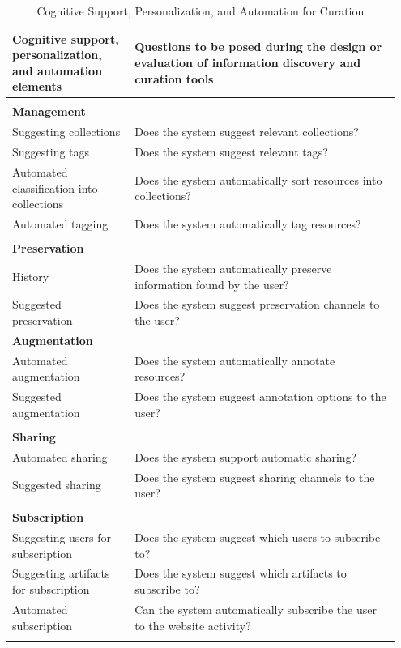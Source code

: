 \documentclass{sigchi}
\begin{document}
{{{\begin{table}[ht!]
\caption{Cognitive Support, Personalization, and Automation for Curation}
\label{table:curation_support}
\begin{tabular}{| p{0.30\linewidth}|p{0.65\linewidth}|}
\hline
Cognitive support, personalization, and automation elements & Questions to be posed during the design or evaluation of information discovery and curation tools \\
\hline
& \\
\textbf{Management}		& \\
Suggesting collections  & Does the system suggest relevant collections? \\
Suggesting tags         & Does the system suggest relevant tags? \\
Automated classification into collections  	& Does the system automatically sort resources into collections? \\
Automated tagging       & Does the system automatically tag resources? \\
& \\
\textbf{Preservation}   & \\
History       			& Does the system automatically preserve information found by the user? \\
Suggested preservation  & Does the system suggest preservation channels to the user? \\
\textbf{Augmentation} 	& \\
Automated augmentation  & Does the system automatically annotate resources? \\
Suggested augmentation  & Does the system suggest annotation options to the user? \\    
& \\
\textbf{Sharing}        & \\
Automated sharing		& Does the system support automatic sharing? \\
Suggested sharing		& Does the system suggest sharing channels to the user? \\
& \\
\textbf{Subscription}   & \\
Suggesting users for subscription & Does the system suggest which users to subscribe to? \\
Suggesting artifacts for subscription   & Does the system suggest which artifacts to subscribe to? \\ 
Automated subscription  & Can the system automatically subscribe the user to the website activity? \\
&\\
\hline  
\end{tabular}
\end{table}

}}}
\end{document}
